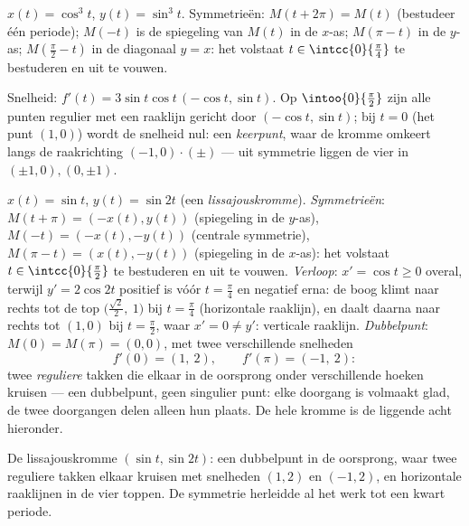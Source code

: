 \begin{example}[De astroïde]\label{ex:b1:curves:astroid}
$x(t) = \cos^3 t$, $y(t) = \sin^3 t$. Symmetrieën:
$M(t + 2\pi) = M(t)$ (bestudeer één periode); $M(-t)$ is de
spiegeling van $M(t)$ in de $x$-as; $M(\pi - t)$ in de $y$-as;
$M(\frac\pi2 - t)$ in de diagonaal $y = x$: het volstaat $t \in
\intcc{0}{\frac\pi4}$ te bestuderen en uit te vouwen.

Snelheid: $f'(t) = 3\sin t\cos t\,(-\cos t, \sin t)$. Op
$\intoo{0}{\frac\pi2}$ zijn alle punten regulier met een raaklijn
gericht door $(-\cos t, \sin t)$; bij $t = 0$ (het punt $(1,0)$)
wordt de snelheid nul: een \emph{keerpunt}, waar de
kromme omkeert langs de raakrichting $(-1, 0)\cdot(\pm)$ --- uit
symmetrie liggen de vier  in $(\pm1, 0), (0, \pm1)$.
\end{example}

\begin{example}
\label{ex:b1:curves:lissajous}
$x(t) = \sin t$, $y(t) = \sin 2t$ (een \emph{lissajouskromme}).
\emph{Symmetrieën}: $M(t + \pi) = (-x(t), y(t))$ (spiegeling in de
$y$-as), $M(-t) = (-x(t), -y(t))$ (centrale symmetrie), $M(\pi -
t) = (x(t), -y(t))$ (spiegeling in de $x$-as): het volstaat $t \in
\intcc{0}{\frac\pi2}$ te bestuderen en uit te vouwen.
\emph{Verloop}: $x' = \cos t \geq 0$ overal, terwijl $y' = 2\cos
2t$ positief is vóór $t = \frac\pi4$ en negatief erna: de boog
klimt naar rechts tot de top $\bigl(\frac{\sqrt2}2,\ 1\bigr)$ bij
$t = \frac\pi4$ (horizontale raaklijn), en daalt daarna naar
rechts tot $(1, 0)$ bij $t = \frac\pi2$, waar $x' = 0 \neq y'$:
verticale raaklijn. \emph{Dubbelpunt}: $M(0) = M(\pi) = (0,0)$,
met twee verschillende snelheden
\[
f'(0) = (1,\ 2), \qquad f'(\pi) = (-1,\ 2) :
\]
twee \emph{reguliere} takken die elkaar in de oorsprong onder
verschillende hoeken kruisen --- een dubbelpunt, geen singulier
punt: elke doorgang is volmaakt glad, de twee doorgangen delen
alleen hun plaats. De hele kromme is de liggende acht hieronder.
\end{example}

\begin{omfigure}

{\small De lissajouskromme $(\sin t, \sin 2t)$: een dubbelpunt in
de oorsprong, waar twee reguliere takken elkaar kruisen met
snelheden $(1, 2)$ en $(-1, 2)$, en horizontale raaklijnen in de
vier toppen. De symmetrie herleidde al het werk tot een kwart
periode.}
\end{omfigure}

